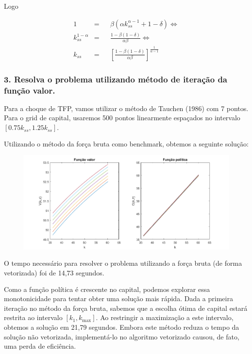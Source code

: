 \documentclass{article}
\begin{document}
Logo

\begin{equation}
\begin{aligned}
1 & = & & \beta (\alpha k_{ss}^{\alpha-1} + 1 - \delta)  \iff \\
k_{ss}^{1-\alpha} & = & & \frac{1-\beta(1-\delta)}{\alpha \beta} \iff \\
k_{ss}            & = & & \left[ \frac{1-\beta(1-\delta)}{\alpha \beta} \right] ^ {\frac{1}{\alpha-1}}
\end{aligned}
\end{equation}

\subsubsection*{3. Resolva o problema utilizando método de iteração da função valor.}

Para a choque de TFP, vamos utilizar o método de Tauchen (1986) com
7 pontos. Para o grid de capital, usaremos 500 pontos linearmente espaçados
no intervalo $[0.75 k_{ss}, 1.25 k_{ss}]$.

Utilizando o método da força bruta como benchmark, obtemos a seguinte solução:

\begin{figure}[h!]
  \includegraphics[width=\linewidth]{graf1.png}
\end{figure}

O tempo necessário para resolver o problema utilizando a força bruta (de forma vetorizada) foi de
14,73 segundos.

Como a função política é crescente no capital, podemos explorar essa
monotonicidade  para tentar obter uma solução mais rápida. Dada a primeira
iteração no método da força bruta, sabemos que a escolha ótima de capital
estará restrita ao intervalo $[k_1, k_{\max}]$. Ao restringir a maximização a
este intervalo, obtemos a solução em 21,79 segundos. Embora este método reduza
o tempo da solução não vetorizada, implementá-lo no algoritmo vetorizado
causou, de fato, uma perda de eficiência.
\end{document}
